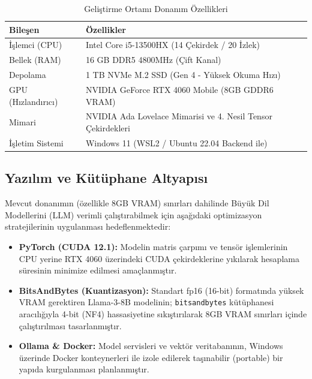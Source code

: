 \documentclass[12pt,a4paper]{report}
\begin{document}
\begin{table}[H]
  \centering
  \caption{Geliştirme Ortamı Donanım Özellikleri}
  \begin{tabular}{|l|l|}
    \hline
    \textbf{Bileşen} & \textbf{Özellikler} \\
    \hline
    İşlemci (CPU) & Intel Core i5-13500HX (14 Çekirdek / 20 İzlek) \\
    \hline
    Bellek (RAM) & 16 GB DDR5 4800MHz (Çift Kanal) \\
    \hline
    Depolama & 1 TB NVMe M.2 SSD (Gen 4 - Yüksek Okuma Hızı) \\
    \hline
    GPU (Hızlandırıcı) & NVIDIA GeForce RTX 4060 Mobile (8GB GDDR6 VRAM) \\
    \hline
    Mimari & NVIDIA Ada Lovelace Mimarisi ve 4. Nesil Tensor Çekirdekleri \\
    \hline
    İşletim Sistemi & Windows 11 (WSL2 / Ubuntu 22.04 Backend ile) \\
    \hline
  \end{tabular}
  \label{tab:donanim}
\end{table}

\newpage

\subsection{Yazılım ve Kütüphane Altyapısı}
Mevcut donanımın (özellikle 8GB VRAM) sınırları dahilinde Büyük Dil Modellerini (LLM) verimli çalıştırabilmek için aşağıdaki optimizasyon stratejilerinin uygulanması hedeflenmektedir:

\begin{itemize}
    \item \textbf{PyTorch (CUDA 12.1):} Modelin matris çarpımı ve tensör işlemlerinin CPU yerine RTX 4060 üzerindeki CUDA çekirdeklerine yıkılarak hesaplama süresinin minimize edilmesi amaçlanmıştır.
    \item \textbf{BitsAndBytes (Kuantizasyon):} Standart fp16 (16-bit) formatında yüksek VRAM gerektiren Llama-3-8B modelinin; \texttt{bitsandbytes} kütüphanesi aracılığıyla 4-bit (NF4) hassasiyetine sıkıştırılarak 8GB VRAM sınırları içinde çalıştırılması tasarlanmıştır.
    \item \textbf{Ollama \& Docker:} Model servisleri ve vektör veritabanının, Windows üzerinde Docker konteynerleri ile izole edilerek taşınabilir (portable) bir yapıda kurgulanması planlanmıştır.
\end{itemize}
\end{document}
